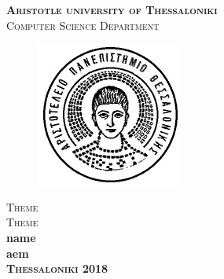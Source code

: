 \documentclass[a4paper,11pt]{article}
\newcommand{\lt}{\latintext}
\begin{document}
  \lt
	\begin{titlepage}
		\begin{center}
			\textsc{\LARGE \bfseries Aristotle university of Thessaloniki}\\[0.2cm]
			\textsc{\large Computer Science Department}\\	
			\begin{figure}[h!]
				\begin{center}
					\leavevmode
					\includegraphics[scale=0.8, trim = 0mm 0mm 0mm 0mm, clip]{auth.jpg}
				\end{center}
			\end{figure}
			\vspace{2cm}
			\textsc{\Large Theme \\Theme\\\vspace{3cm}}
				\large \bfseries name \\ aem 
			\\
		\vspace*{\fill}
		\vspace{3cm}
		\textsc{Thessaloniki 2018}		
		\end{center}
	\end{titlepage}
	\newpage
\end{document}
